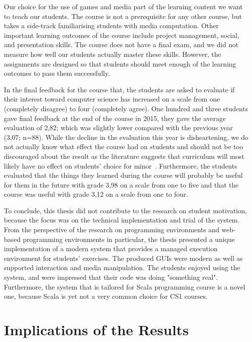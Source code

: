 Our choice for the use of games and media part of the learning content we want to teach our students. The course is not a prerequisite for any other course, but takes a side-track familiarising students with media computation. Other important learning outcomes of the course include project management, social, and presentation skills. The course does not have a final exam, and we did not measure how well our students actually master these skills. However, the assignments are designed so that students should meet enough of the learning outcomes to pass them successfully.

In the final feedback for the course that, the students are asked to evaluate if their interest toward computer science has increased on a scale from one (completely disagree) to four (completely agree). One hundred and three students gave final feedback at the end of the course in 2015, they gave the average evaluation of 2,82; which was slightly lower compared with the previous year (3,07; n=88). While the decline in the evaluation this year is disheartening, we do not actually know what effect the course had on students and should not be too discouraged about the result as the literature suggests that curriculum will most likely have no effect on students' choice for minor~\cite{guzdial:2013}. Furthermore, the students evaluated that the things they learned during the course will probably be useful for them in the future with grade 3,98 on a scale from one to five and that the course was useful with grade 3,12 on a scale from one to four.

To conclude, this thesis did not contribute to the research on student motivation, because the focus was on the technical implementation and trial of the system. From the perspective of the research on programming environments and web-based programming environments in particular, the thesis presented a unique implementation of a modern system that provides a managed execution environment for students' exercises. The produced GUIs were modern as well as supported interaction and media manipulation. The students enjoyed using the system, and were impressed that their code was doing "something real". Furthermore, the system that is tailored for Scala programming course is a novel one, because Scala is yet not a very common choice for CS1 courses.


\section{Implications of the Results}
\label{section:implications}

